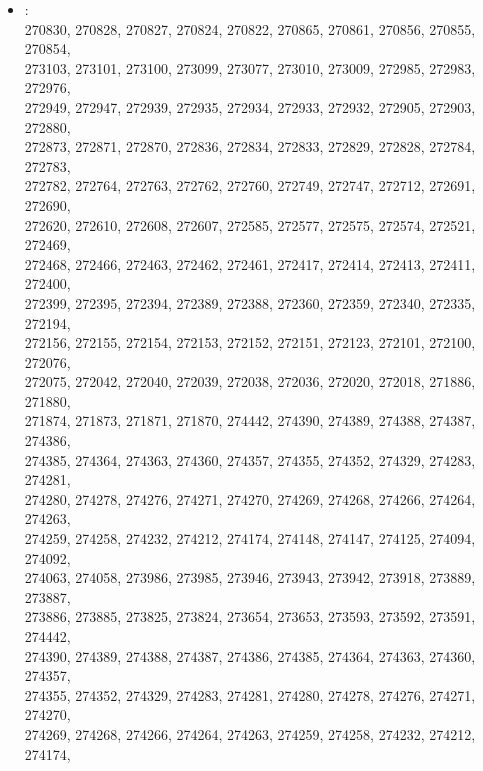 \begin{appendix}
\vspace{\columnsep}
\begin{itemize}
    \small
    \item[] :\\[5pt]
    \footnotesize
     270830, 270828, 270827, 270824, 270822, 270865, 270861, 270856, 270855, 270854,\\
     273103, 273101, 273100, 273099, 273077, 273010, 273009, 272985, 272983, 272976,\\
     272949, 272947, 272939, 272935, 272934, 272933, 272932, 272905, 272903, 272880,\\
     272873, 272871, 272870, 272836, 272834, 272833, 272829, 272828, 272784, 272783,\\
     272782, 272764, 272763, 272762, 272760, 272749, 272747, 272712, 272691, 272690,\\
     272620, 272610, 272608, 272607, 272585, 272577, 272575, 272574, 272521, 272469,\\
     272468, 272466, 272463, 272462, 272461, 272417, 272414, 272413, 272411, 272400,\\
     272399, 272395, 272394, 272389, 272388, 272360, 272359, 272340, 272335, 272194,\\
     272156, 272155, 272154, 272153, 272152, 272151, 272123, 272101, 272100, 272076,\\
     272075, 272042, 272040, 272039, 272038, 272036, 272020, 272018, 271886, 271880,\\
     271874, 271873, 271871, 271870, 274442, 274390, 274389, 274388, 274387, 274386,\\
     274385, 274364, 274363, 274360, 274357, 274355, 274352, 274329, 274283, 274281,\\
     274280, 274278, 274276, 274271, 274270, 274269, 274268, 274266, 274264, 274263,\\
     274259, 274258, 274232, 274212, 274174, 274148, 274147, 274125, 274094, 274092,\\
     274063, 274058, 273986, 273985, 273946, 273943, 273942, 273918, 273889, 273887,\\
     273886, 273885, 273825, 273824, 273654, 273653, 273593, 273592, 273591, 274442,\\
     274390, 274389, 274388, 274387, 274386, 274385, 274364, 274363, 274360, 274357,\\
     274355, 274352, 274329, 274283, 274281, 274280, 274278, 274276, 274271, 274270,\\
     274269, 274268, 274266, 274264, 274263, 274259, 274258, 274232, 274212, 274174,\\

\end{itemize}
\end{appendix}
